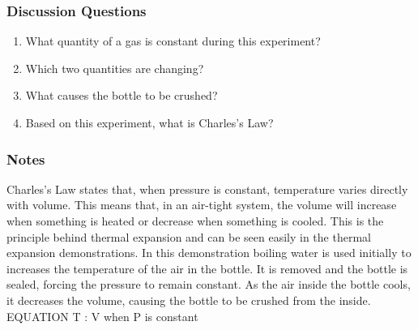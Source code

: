 \subsubsection*{Discussion Questions}
\begin{enumerate}
\item{What quantity of a gas is constant during this experiment?}
\item{Which two quantities are changing?}
\item{What causes the bottle to be crushed?}
\item{Based on this experiment, what is Charles's Law?}
\end{enumerate}

\subsubsection*{Notes}
Charles's Law states that, when pressure is constant, temperature varies directly with volume. This means that, in an air-tight system, the volume will increase when something is heated or decrease when something is cooled. This is the principle behind thermal expansion and can be seen easily in the thermal expansion demonstrations.  
In this demonstration boiling water is used initially to increases the temperature of the air in the bottle. It is removed and the bottle is sealed, forcing the pressure to remain constant. As the air inside the bottle cools, it decreases the volume, causing the bottle to be crushed from the inside.  EQUATION  T : V when P is constant
